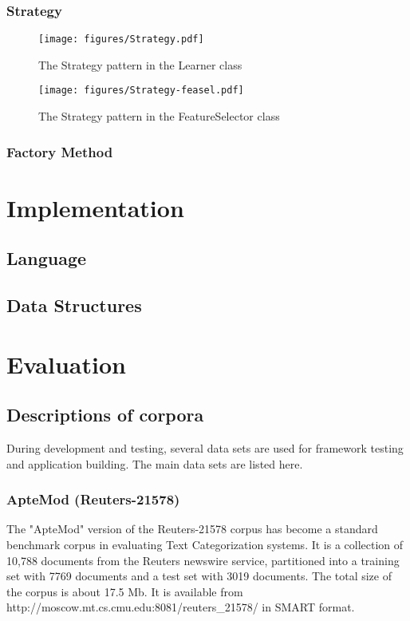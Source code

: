 \documentclass[a4paper]{report}
\begin{document}
\subsection{Strategy}
\begin{figure}
\texttt{[image: figures/Strategy.pdf]}
\caption{The Strategy pattern in the Learner class}
\label{Strategy-learner}
\end{figure}

\begin{figure}
\texttt{[image: figures/Strategy-feasel.pdf]}
\caption{The Strategy pattern in the FeatureSelector class}
\label{Strategy-feasel}
\end{figure}

\subsection{Factory Method}

\chapter{Implementation}

\section{Language}
\section{Data Structures}

\chapter{Evaluation}

\section{Descriptions of corpora}
During development and testing, several data sets are used for
framework testing and application building.  The main data sets are
listed here.


\subsection{ApteMod (Reuters-21578)}


The "ApteMod" version of the Reuters-21578 corpus has become a
standard benchmark corpus in evaluating Text Categorization systems.
It is a collection of 10,788 documents from the Reuters newswire
service, partitioned into a training set with 7769 documents and a
test set with 3019 documents.  The total size of the corpus is about
17.5 Mb.  It is available from
http://moscow.mt.cs.cmu.edu:8081/reuters\_21578/ in SMART format.
\end{document}
